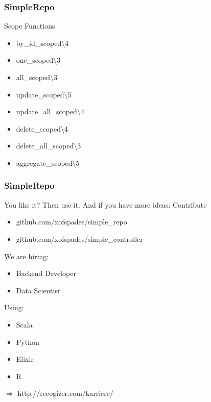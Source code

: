 \documentclass{beamer}
\begin{document}

\begin{frame}[fragile]
\frametitle{SimpleRepo}
\centerline{Scope Functions}
\begin{itemize}
\item by\_id\_scoped\textbackslash4
\item one\_scoped\textbackslash3
\item all\_scoped\textbackslash3
\item update\_scoped\textbackslash5
\item update\_all\_scoped\textbackslash4
\item delete\_scoped\textbackslash4
\item delete\_all\_scoped\textbackslash3
\item aggregate\_scoped\textbackslash5
\end{itemize}
\end{frame}


\begin{frame}[fragile]
\frametitle{SimpleRepo}
\centerline{You like it? Then use it. And if you have more ideas: Contribute}
\begin{itemize}
\item github.com/xofspades/simple\_repo
\pause
\item github.com/xofspades/simple\_controller
\end{itemize}
\end{frame}


{
\begin{frame}
\vspace{30 px}
We are hiring:
\begin{itemize}
\item Backend Developer
\item Data Scientist
\end{itemize}
Using:
\begin{itemize}
\item Scala
\item Python
\item Elixir
\item R
\end{itemize}
$\Rightarrow$ http://recogizer.com/karriere/
\end{frame}
}

\end{document}
